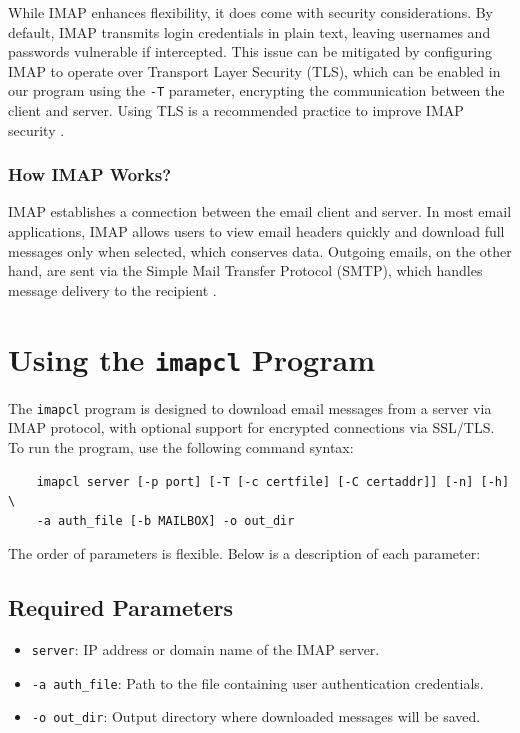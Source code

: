\documentclass[a4paper,11pt]{article}
\begin{document}
While IMAP enhances flexibility, it does come with security considerations. By default, IMAP transmits 
login credentials in plain text, leaving usernames and passwords vulnerable if intercepted. This issue 
can be mitigated by configuring IMAP to operate over Transport Layer Security (TLS), which can be enabled 
in our program using the \texttt{-T} parameter, encrypting the communication between the client and server. 
Using TLS is a recommended practice to improve IMAP security \cite{what_is_imap, imap_pop_difference, email_protocols}.

\subsubsection{How IMAP Works?}
IMAP establishes a connection between the email client and server. In most email applications, IMAP allows users to view email headers quickly and download full messages only when selected, which conserves data. Outgoing emails, on the other hand, are sent via the Simple Mail Transfer Protocol (SMTP), which handles message delivery to the recipient \cite{techtarget_imap, email_protocols}.


\section{Using the \texttt{imapcl} Program}
The \texttt{imapcl} program is designed to download email messages from a server via IMAP protocol, 
with optional support for encrypted connections via SSL/TLS. To run the program, use the following 
command syntax:

\begin{verbatim}
    imapcl server [-p port] [-T [-c certfile] [-C certaddr]] [-n] [-h] \
    -a auth_file [-b MAILBOX] -o out_dir
\end{verbatim}

The order of parameters is flexible. Below is a description of each parameter:

\subsection{Required Parameters}
\begin{itemize}
    \item \texttt{server}: IP address or domain name of the IMAP server.
    \item \texttt{-a auth\_file}: Path to the file containing user authentication credentials.
    \item \texttt{-o out\_dir}: Output directory where downloaded messages will be saved.
\end{itemize}
\end{document}
